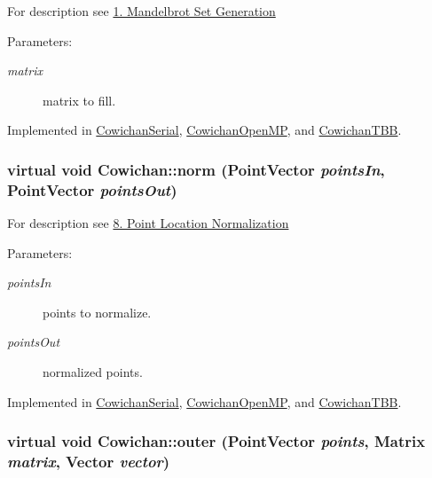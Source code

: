 For description see \hyperlink{index_mandel_sec}{1. Mandelbrot Set Generation} \begin{Desc}
\item[Parameters:]
\begin{description}
\item[{\em matrix}]matrix to fill. \end{description}
\end{Desc}


Implemented in \hyperlink{class_cowichan_serial_97a58b7901d8a7680cc28d42cb94d532}{CowichanSerial}, \hyperlink{class_cowichan_open_m_p_6809c2738792de047ee59259636c1afd}{CowichanOpenMP}, and \hyperlink{class_cowichan_t_b_b_1e58b60ff22a58aba69567ecc6740878}{CowichanTBB}.\hypertarget{class_cowichan_3df21e3c627958114e045c3559a29f30}{
\subsubsection[{norm}]{\setlength{\rightskip}{0pt plus 5cm}virtual void Cowichan::norm ({\bf PointVector} {\em pointsIn}, \/  {\bf PointVector} {\em pointsOut})}}
\label{class_cowichan_3df21e3c627958114e045c3559a29f30}


For description see \hyperlink{index_norm_sec}{8. Point Location Normalization} \begin{Desc}
\item[Parameters:]
\begin{description}
\item[{\em pointsIn}]points to normalize. \item[{\em pointsOut}]normalized points. \end{description}
\end{Desc}


Implemented in \hyperlink{class_cowichan_serial_0eeb47447c6a6b94ff7c6999c96fda0e}{CowichanSerial}, \hyperlink{class_cowichan_open_m_p_4ffbe36816235bc6abec30eae2be2d78}{CowichanOpenMP}, and \hyperlink{class_cowichan_t_b_b_ca08645b51a242317a115cd7ce7d81fe}{CowichanTBB}.\hypertarget{class_cowichan_52f17221019290b88334b0ca7f3bcdb9}{
\subsubsection[{outer}]{\setlength{\rightskip}{0pt plus 5cm}virtual void Cowichan::outer ({\bf PointVector} {\em points}, \/  {\bf Matrix} {\em matrix}, \/  {\bf Vector} {\em vector})}}
\label{class_cowichan_52f17221019290b88334b0ca7f3bcdb9}


